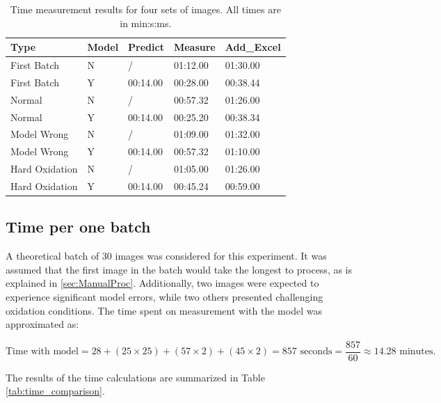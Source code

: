 \begin{table}[H]
\centering
\begin{tabular}{|l|l|l|l|l|}
\hline
\textbf{Type}           & \textbf{Model} & \textbf{Predict} & \textbf{Measure} & \textbf{Add\_Excel} \\ \hline
First Batch             & N             & /                & 01:12.00         & 01:30.00         \\ \hline
First Batch             & Y             & 00:14.00         & 00:28.00         & 00:38.44         \\ \hline
Normal                  & N             & /                & 00:57.32         & 01:26.00         \\ \hline
Normal                  & Y             & 00:14.00         & 00:25.20         & 00:38.34         \\ \hline
Model Wrong             & N             & /                & 01:09.00         & 01:32.00         \\ \hline
Model Wrong             & Y             & 00:14.00         & 00:57.32         & 01:10.00         \\ \hline
Hard Oxidation          & N             & /                & 01:05.00         & 01:26.00         \\ \hline
Hard Oxidation          & Y             & 00:14.00         & 00:45.24         & 00:59.00         \\ \hline
\end{tabular}
\caption{Time measurement results for four sets of images. All times are in min:s:ms.}
\label{tab:time-measurements}
\end{table}
\subsection{Time per one batch}

A theoretical batch of 30 images was considered for this experiment. It was assumed that the first image in the batch would take the longest to process, as is explained in \ref{sec:ManualProc}. Additionally, two images were expected to experience significant model errors, while two others presented challenging oxidation conditions. The time spent on measurement with the model was approximated as:

\[
\text{Time with model} = 28 + (25 \times 25) + (57 \times 2) + (45 \times 2) = 857 \text{ seconds} = \frac{857}{60} \approx 14.28 \text{ minutes}.
\]

The results of the time calculations are summarized in Table \ref{tab:time_comparison}.

